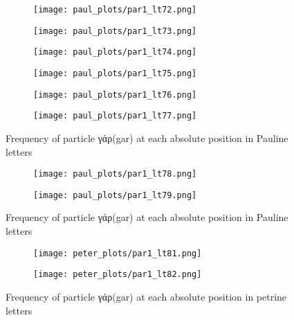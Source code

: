 \documentclass[a4paper]{article}
\begin{document}
\begin{figure}
\ContinuedFloat
\begin{subfigure}{0.45\textwidth}
\centering
\texttt{[image: paul\_plots/par1\_lt72.png]}
\end{subfigure}
\begin{subfigure}{0.45\textwidth}
\centering
\texttt{[image: paul\_plots/par1\_lt73.png]}
\end{subfigure}
\begin{subfigure}{0.45\textwidth}
\centering
\texttt{[image: paul\_plots/par1\_lt74.png]}
\end{subfigure}
\begin{subfigure}{0.45\textwidth}
\centering
\texttt{[image: paul\_plots/par1\_lt75.png]}
\end{subfigure}
\begin{subfigure}{0.45\textwidth}
\centering
\texttt{[image: paul\_plots/par1\_lt76.png]}
\end{subfigure}
\begin{subfigure}{0.45\textwidth}
\centering
\texttt{[image: paul\_plots/par1\_lt77.png]}
\end{subfigure}
\caption{Frequency of particle \textgreek{γάρ}(gar) at each absolute position in Pauline letters}
\end{figure}

\begin{figure}
\ContinuedFloat
\begin{subfigure}{0.45\textwidth}
\centering
\texttt{[image: paul\_plots/par1\_lt78.png]}
\end{subfigure}
\begin{subfigure}{0.45\textwidth}
\centering
\texttt{[image: paul\_plots/par1\_lt79.png]}
\end{subfigure}
\caption{Frequency of particle \textgreek{γάρ}(gar) at each absolute position in Pauline letters}
\end{figure}

\begin{figure}
\begin{subfigure}{0.45\textwidth}
\centering
\texttt{[image: peter\_plots/par1\_lt81.png]}
\end{subfigure}
\begin{subfigure}{0.45\textwidth}
\centering
\texttt{[image: peter\_plots/par1\_lt82.png]}
\end{subfigure}
\caption{Frequency of particle \textgreek{γάρ}(gar) at each absolute position in petrine letters}
\label{peter_yap}
\end{figure}
\end{document}
